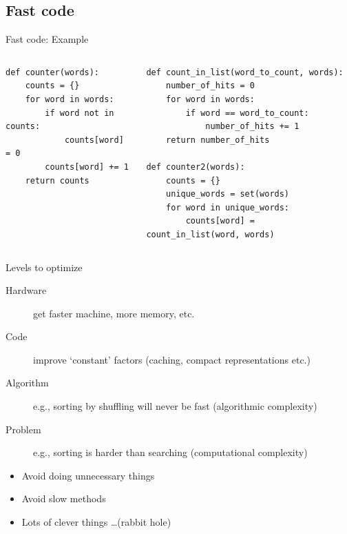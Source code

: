 \documentclass[aspectratio=169,usenames,dvipsnames]{beamer}
\begin{document}
\subsection{Fast code}
\begin{frame}[fragile]{Fast code: Example}
    \begin{columns}[T]
\begin{lstlisting}
def counter(words):
    counts = {}
    for word in words:
        if word not in counts:
            counts[word] = 0
        counts[word] += 1
    return counts
\end{lstlisting}
\begin{lstlisting}
def count_in_list(word_to_count, words):
    number_of_hits = 0
    for word in words:
        if word == word_to_count:
            number_of_hits += 1
    return number_of_hits

def counter2(words):
    counts = {}
    unique_words = set(words)
    for word in unique_words:
        counts[word] = count_in_list(word, words)
\end{lstlisting}
\end{columns}
\end{frame}


\begin{frame}{Levels to optimize}
    \begin{description}
        \item[Hardware] get faster machine, more memory, etc.
        \item[Code] improve `constant' factors (caching, compact representations etc.)
        \item[Algorithm] e.g., sorting by shuffling will never be fast (algorithmic complexity)
        \item[Problem] e.g., sorting is harder than searching (computational complexity)
    \end{description}

    \pause
    \begin{itemize}
        \item Avoid doing unnecessary things
        \item Avoid slow methods
        \item Lots of clever things \dots (rabbit hole)
    \end{itemize}
\end{frame}
\end{document}
